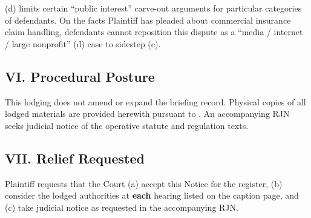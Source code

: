 (d) limits certain ``public interest'' carve-out arguments for particular categories of defendants. On the facts Plaintiff has pleaded about commercial insurance claim handling, defendants cannot reposition this dispute as a ``media / internet / large nonprofit'' (d) case to sidestep (c).

\subsection*{VI. Procedural Posture}

This lodging does not amend or expand the briefing record. Physical copies of all lodged materials are provided herewith pursuant to . An accompanying RJN seeks judicial notice of the operative statute and regulation texts.

\subsection*{VII. Relief Requested}

Plaintiff requests that the Court (a) accept this Notice for the register, (b) consider the lodged authorities at \textbf{each} hearing listed on the caption page, and (c) take judicial notice as requested in the accompanying RJN.



